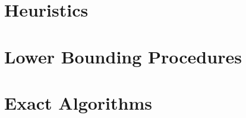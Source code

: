 

\clearpage


\section{Heuristics}\label{sec:solving:heuristics}

\section{Lower Bounding Procedures}
\label{sec:solving:lower}

\section{Exact Algorithms}\label{sec:solving:exact}
